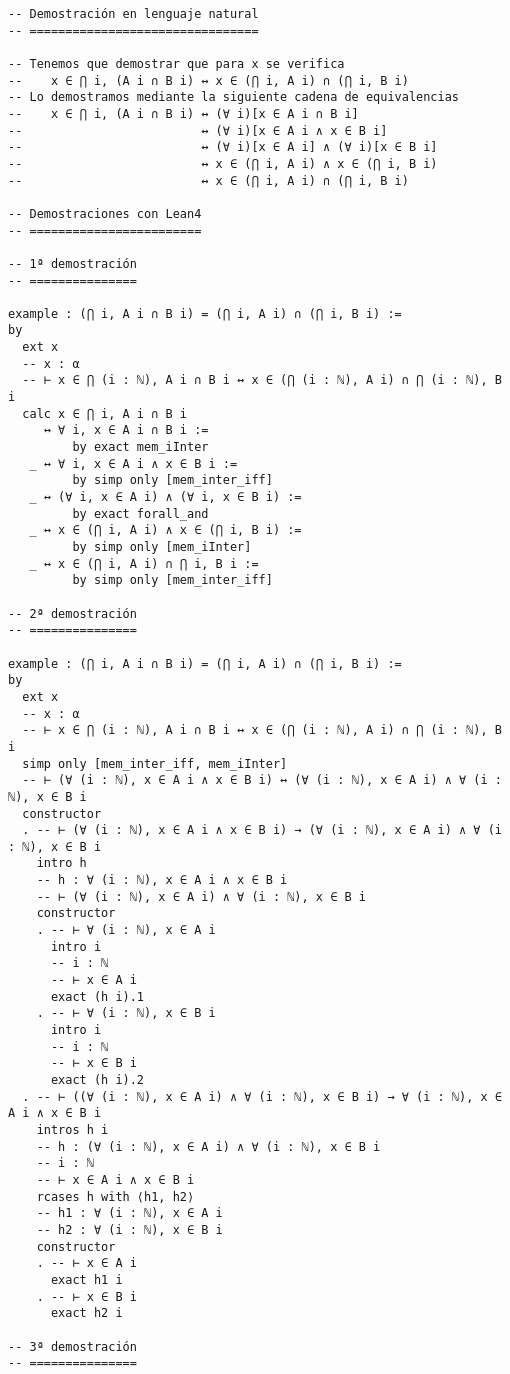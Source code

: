 \begin{verbatim}
-- Demostración en lenguaje natural
-- ================================

-- Tenemos que demostrar que para x se verifica
--    x ∈ ⋂ i, (A i ∩ B i) ↔ x ∈ (⋂ i, A i) ∩ (⋂ i, B i)
-- Lo demostramos mediante la siguiente cadena de equivalencias
--    x ∈ ⋂ i, (A i ∩ B i) ↔ (∀ i)[x ∈ A i ∩ B i]
--                         ↔ (∀ i)[x ∈ A i ∧ x ∈ B i]
--                         ↔ (∀ i)[x ∈ A i] ∧ (∀ i)[x ∈ B i]
--                         ↔ x ∈ (⋂ i, A i) ∧ x ∈ (⋂ i, B i)
--                         ↔ x ∈ (⋂ i, A i) ∩ (⋂ i, B i)

-- Demostraciones con Lean4
-- ========================

-- 1ª demostración
-- ===============

example : (⋂ i, A i ∩ B i) = (⋂ i, A i) ∩ (⋂ i, B i) :=
by
  ext x
  -- x : α
  -- ⊢ x ∈ ⋂ (i : ℕ), A i ∩ B i ↔ x ∈ (⋂ (i : ℕ), A i) ∩ ⋂ (i : ℕ), B i
  calc x ∈ ⋂ i, A i ∩ B i
     ↔ ∀ i, x ∈ A i ∩ B i :=
         by exact mem_iInter
   _ ↔ ∀ i, x ∈ A i ∧ x ∈ B i :=
         by simp only [mem_inter_iff]
   _ ↔ (∀ i, x ∈ A i) ∧ (∀ i, x ∈ B i) :=
         by exact forall_and
   _ ↔ x ∈ (⋂ i, A i) ∧ x ∈ (⋂ i, B i) :=
         by simp only [mem_iInter]
   _ ↔ x ∈ (⋂ i, A i) ∩ ⋂ i, B i :=
         by simp only [mem_inter_iff]

-- 2ª demostración
-- ===============

example : (⋂ i, A i ∩ B i) = (⋂ i, A i) ∩ (⋂ i, B i) :=
by
  ext x
  -- x : α
  -- ⊢ x ∈ ⋂ (i : ℕ), A i ∩ B i ↔ x ∈ (⋂ (i : ℕ), A i) ∩ ⋂ (i : ℕ), B i
  simp only [mem_inter_iff, mem_iInter]
  -- ⊢ (∀ (i : ℕ), x ∈ A i ∧ x ∈ B i) ↔ (∀ (i : ℕ), x ∈ A i) ∧ ∀ (i : ℕ), x ∈ B i
  constructor
  . -- ⊢ (∀ (i : ℕ), x ∈ A i ∧ x ∈ B i) → (∀ (i : ℕ), x ∈ A i) ∧ ∀ (i : ℕ), x ∈ B i
    intro h
    -- h : ∀ (i : ℕ), x ∈ A i ∧ x ∈ B i
    -- ⊢ (∀ (i : ℕ), x ∈ A i) ∧ ∀ (i : ℕ), x ∈ B i
    constructor
    . -- ⊢ ∀ (i : ℕ), x ∈ A i
      intro i
      -- i : ℕ
      -- ⊢ x ∈ A i
      exact (h i).1
    . -- ⊢ ∀ (i : ℕ), x ∈ B i
      intro i
      -- i : ℕ
      -- ⊢ x ∈ B i
      exact (h i).2
  . -- ⊢ ((∀ (i : ℕ), x ∈ A i) ∧ ∀ (i : ℕ), x ∈ B i) → ∀ (i : ℕ), x ∈ A i ∧ x ∈ B i
    intros h i
    -- h : (∀ (i : ℕ), x ∈ A i) ∧ ∀ (i : ℕ), x ∈ B i
    -- i : ℕ
    -- ⊢ x ∈ A i ∧ x ∈ B i
    rcases h with ⟨h1, h2⟩
    -- h1 : ∀ (i : ℕ), x ∈ A i
    -- h2 : ∀ (i : ℕ), x ∈ B i
    constructor
    . -- ⊢ x ∈ A i
      exact h1 i
    . -- ⊢ x ∈ B i
      exact h2 i

-- 3ª demostración
-- ===============


\end{verbatim}
